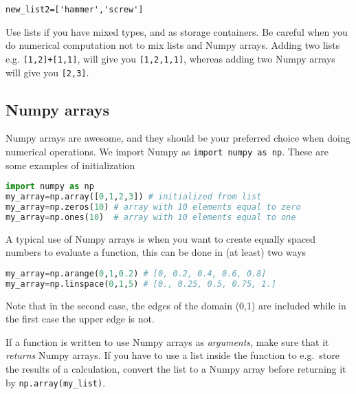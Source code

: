 \documentclass[graybox,sectrefs,envcountresetchap,open=right,final]{svmonodo}
\newenvironment{graybox2admon}[1][]{
\begin{graybox2mdframed}[frametitle=#1]
}
{
\end{graybox2mdframed}
}
\begin{document}
\Verb!new_list2=['hammer','screw']!



\begin{graybox2admon}[When to use lists]
Use lists if you have mixed types, and as storage containers. Be careful when you do numerical computation not to mix lists and Numpy arrays. Adding two lists e.g. \texttt{[1,2]+[1,1]}, will give you \texttt{[1,2,1,1]}, whereas adding two Numpy arrays will give you \texttt{[2,3]}.
\end{graybox2admon}




\subsection{Numpy arrays}
Numpy arrays are awesome, and they should be your preferred choice when doing numerical operations. We import Numpy as \texttt{import numpy as np}. These are some examples of initialization





\begin{lstlisting}[language=python,style=blue1bar]
import numpy as np
my_array=np.array([0,1,2,3]) # initialized from list
my_array=np.zeros(10) # array with 10 elements equal to zero
my_array=np.ones(10)  # array with 10 elements equal to one

\end{lstlisting}

A typical use of Numpy arrays is when you want to create equally spaced numbers to evaluate a function, this can be done in (at least) two ways



\begin{lstlisting}[language=python,style=blue1bar]
my_array=np.arange(0,1,0.2) # [0, 0.2, 0.4, 0.6, 0.8]
my_array=np.linspace(0,1,5) # [0., 0.25, 0.5, 0.75, 1.]

\end{lstlisting}

Note that in the second case, the edges of the domain (0,1) are included while in the first case the upper edge is not. 



\begin{graybox2admon}[Do not mix Numpy arrays and lists in functions]
If a function is written to use  Numpy arrays as \emph{arguments}, make sure that it \emph{returns} Numpy arrays. If you have to use a list inside the function to e.g.~store the results of a calculation, convert the list to a Numpy array before returning it by \Verb!np.array(my_list)!.
\end{graybox2admon}
\end{document}
